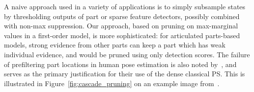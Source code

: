  A naive approach used in a variety 
of applications is to simply subsample states by thresholding outputs of part 
or sparse feature detectors, possibly combined with non-max suppression.  Our 
approach, based on pruning on max-marginal values in a first-order model, is 
more sophisticated: for articulated parts-based models, strong evidence from 
other parts can keep a part which has weak individual evidence, and would be 
pruned using only detection scores.  The failure of prefiltering  part 
locations in human pose estimation is also noted by~\cite{andriluka09}, and 
serves as the primary justification for their use of the dense classical PS. 
This is illustrated in Figure~\ref{fig:cascade_pruning} on an example image 
from~\cite{ferrari08}.



